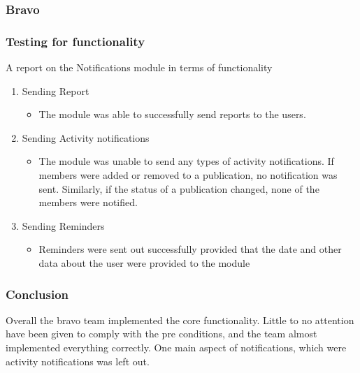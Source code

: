 \subsubsection{Bravo}
\subsubsection*{Testing for functionality}
A report on the Notifications module in terms of functionality 
\begin{enumerate}
	\item Sending Report 
		\begin{itemize}
			\item The module was able to successfully send reports to the users. 
		\end{itemize}
	\item Sending Activity notifications
		\begin{itemize}
			\item The module was unable to send any types of activity notifications. If members were added or removed to a publication, no notification was sent. Similarly, if the status of a publication changed, none of the members were notified. 
		\end{itemize}
	\item Sending Reminders
		\begin{itemize}
			\item Reminders were sent out successfully provided that the date and other data about the user were provided to the module
		\end{itemize}
\end{enumerate}

\subsubsection*{Conclusion}
Overall the bravo team implemented the core functionality. Little to no attention have been given to comply with the pre conditions, and the team almost implemented everything correctly. One main aspect of notifications, which were activity notifications was left out.
